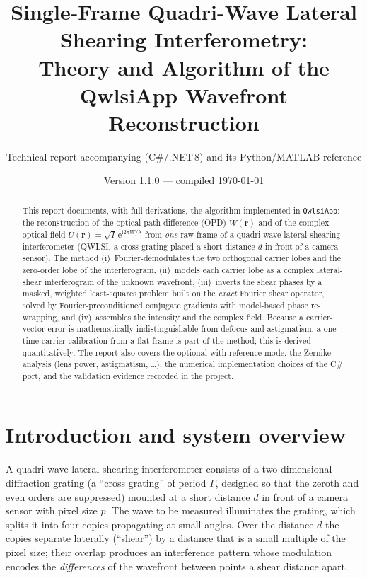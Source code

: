 \documentclass[11pt,a4paper]{article}
\title{\textbf{Single-Frame Quadri-Wave Lateral Shearing Interferometry:\\
Theory and Algorithm of the QwlsiApp Wavefront Reconstruction}}
\author{Technical report accompanying \code{QwlsiApp} (C\#/.NET\,8) and its Python/MATLAB reference}
\date{Version 1.1.0 --- compiled \today}
\theoremstyle{definition}
\newcommand{\vr}{\bm{r}}
\newcommand{\ii}{\mathrm{i}}
\newcommand{\ee}{\mathrm{e}}
\newcommand{\code}[1]{\texttt{\small #1}}
\begin{document}
\maketitle

\begin{abstract}
\noindent
This report documents, with full derivations, the algorithm implemented in \code{QwlsiApp}: the reconstruction of
the optical path difference (OPD) $W(\vr)$ and of the complex optical field $U(\vr)=\sqrt{I}\,\ee^{\ii 2\pi W/\lambda}$ from
\emph{one} raw frame of a quadri-wave lateral shearing interferometer (QWLSI, a cross-grating placed a short distance
$d$ in front of a camera sensor). The method (i)~Fourier-demodulates the two orthogonal carrier lobes and the zero-order lobe of the
interferogram, (ii)~models each carrier lobe as a complex lateral-shear interferogram of the unknown wavefront,
(iii)~inverts the shear phases by a masked, weighted least-squares problem built on the \emph{exact} Fourier shear operator, solved by
Fourier-preconditioned conjugate gradients with model-based phase re-wrapping, and (iv)~assembles the intensity and the complex field.
Because a carrier-vector error is mathematically indistinguishable from defocus and astigmatism, a one-time carrier calibration from a flat frame is part
of the method; this is derived quantitatively. The report also covers the optional with-reference mode, the Zernike analysis (lens power, astigmatism, \dots),
the numerical implementation choices of the C\# port, and the validation evidence recorded in the project.
\end{abstract}

\tableofcontents
\newpage

\section{Introduction and system overview}
A quadri-wave lateral shearing interferometer \cite{Primot2000,Baffou2012} consists of a two-dimensional diffraction grating
(a ``cross grating'' of period $\Gamma$, designed so that the zeroth and even orders are suppressed) mounted at a short distance $d$ in front of a camera
sensor with pixel size $p$. The wave to be measured illuminates the grating, which splits it into four copies propagating at small angles. Over
the distance $d$ the copies separate laterally (``shear'') by a distance that is a small multiple of the pixel size; their overlap produces an interference pattern whose
modulation encodes the \emph{differences} of the wavefront between points a shear distance apart.
\end{document}
